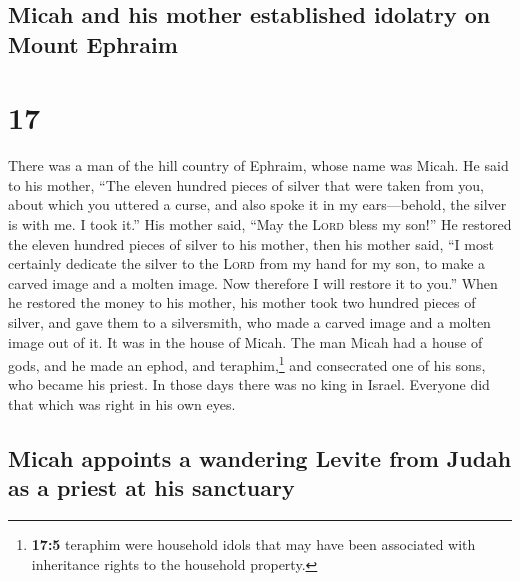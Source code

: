 \hypertarget{micah-and-his-mother-established-idolatry-on-mount-ephraim}{%
\subsection{Micah and his mother established idolatry on Mount
Ephraim}\label{micah-and-his-mother-established-idolatry-on-mount-ephraim}}

\hypertarget{section-16}{%
\section{17}\label{section-16}}

 There was a man of the hill country of Ephraim, whose
name was Micah.  He said to his mother, ``The eleven
hundred pieces of silver that were taken from you, about which you
uttered a curse, and also spoke it in my ears---behold, the silver is
with me. I took it.'' His mother said, ``May the \textsc{Lord} bless my
son!''  He restored the eleven hundred pieces of silver to
his mother, then his mother said, ``I most certainly dedicate the silver
to the \textsc{Lord} from my hand for my son, to make a carved image and
a molten image. Now therefore I will restore it to you.'' 
When he restored the money to his mother, his mother took two hundred
pieces of silver, and gave them to a silversmith, who made a carved
image and a molten image out of it. It was in the house of Micah.
 The man Micah had a house of gods, and he made an ephod,
and teraphim,\footnote{\textbf{17:5} teraphim were household idols that
  may have been associated with inheritance rights to the household
  property.} and consecrated one of his sons, who became his priest.
 In those days there was no king in Israel. Everyone did
that which was right in his own eyes.

\hypertarget{micah-appoints-a-wandering-levite-from-judah-as-a-priest-at-his-sanctuary}{%
\subsection{Micah appoints a wandering Levite from Judah as a priest at
his
sanctuary}\label{micah-appoints-a-wandering-levite-from-judah-as-a-priest-at-his-sanctuary}}

